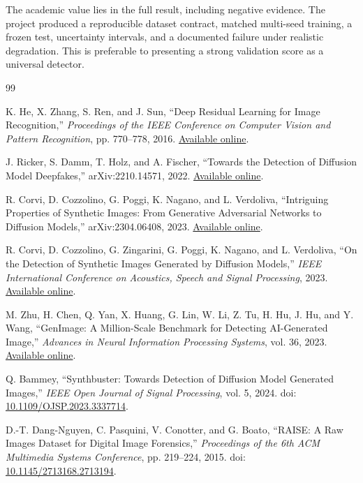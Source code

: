\documentclass[12pt,a4paper]{article}
\begin{document}
The academic value lies in the full result, including negative evidence. The project produced a
reproducible dataset contract, matched multi-seed training, a frozen test, uncertainty intervals,
and a documented failure under realistic degradation. This is preferable to presenting a strong
validation score as a universal detector.

\clearpage
\begin{thebibliography}{99}

K. He, X. Zhang, S. Ren, and J. Sun,
``Deep Residual Learning for Image Recognition,''
\emph{Proceedings of the IEEE Conference on Computer Vision and Pattern Recognition},
pp. 770--778, 2016.
\href{https://openaccess.thecvf.com/content_cvpr_2016/html/He_Deep_Residual_Learning_CVPR_2016_paper.html}{Available online}.

J. Ricker, S. Damm, T. Holz, and A. Fischer,
``Towards the Detection of Diffusion Model Deepfakes,'' arXiv:2210.14571, 2022.
\href{https://arxiv.org/abs/2210.14571}{Available online}.

R. Corvi, D. Cozzolino, G. Poggi, K. Nagano, and L. Verdoliva,
``Intriguing Properties of Synthetic Images: From Generative Adversarial Networks to Diffusion
Models,'' arXiv:2304.06408, 2023.
\href{https://arxiv.org/abs/2304.06408}{Available online}.

R. Corvi, D. Cozzolino, G. Zingarini, G. Poggi, K. Nagano, and L. Verdoliva,
``On the Detection of Synthetic Images Generated by Diffusion Models,''
\emph{IEEE International Conference on Acoustics, Speech and Signal Processing}, 2023.
\href{https://arxiv.org/abs/2211.00680}{Available online}.

M. Zhu, H. Chen, Q. Yan, X. Huang, G. Lin, W. Li, Z. Tu, H. Hu, J. Hu, and Y. Wang,
``GenImage: A Million-Scale Benchmark for Detecting AI-Generated Image,''
\emph{Advances in Neural Information Processing Systems}, vol. 36, 2023.
\href{https://proceedings.neurips.cc/paper_files/paper/2023/hash/f4d4a021f9051a6c18183b059117e8b5-Abstract-Datasets_and_Benchmarks.html}{Available online}.

Q. Bammey, ``Synthbuster: Towards Detection of Diffusion Model Generated Images,''
\emph{IEEE Open Journal of Signal Processing}, vol. 5, 2024.
doi: \href{https://doi.org/10.1109/OJSP.2023.3337714}{10.1109/OJSP.2023.3337714}.

D.-T. Dang-Nguyen, C. Pasquini, V. Conotter, and G. Boato,
``RAISE: A Raw Images Dataset for Digital Image Forensics,''
\emph{Proceedings of the 6th ACM Multimedia Systems Conference}, pp. 219--224, 2015.
doi: \href{https://doi.org/10.1145/2713168.2713194}{10.1145/2713168.2713194}.


\end{thebibliography}
\end{document}
